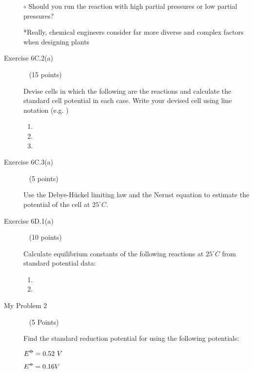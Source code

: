\documentclass[12pt, openany, letterpaper]{memoir}
\begin{document}
\begin{description}
	\vspace{7em}
	\noindent $\circ$ Should you run the reaction with high partial pressures or low partial pressures?

	\vspace{7em}
	*Really, chemical engineers consider far more diverse and complex factors when designing plants
	
	\vspace{2em}
	\item [Exercise 6C.2(a)] ~ (15 points)
	
	Devise cells in which the following are the reactions and calculate the standard cell potential in each case. Write your devised cell using line notation (e.g. )
	\begin{enumerate}
		\item {}
		
		\vspace{6em}
		\item {}
		
		\vspace{6em}
		\item {}
	\end{enumerate}
	
	\vspace{6em}
	
	\item [Exercise 6C.3(a)] ~ (5 points)
	
	Use the Debye-H\"uckel limiting law and the Nernst equation to estimate the potential of the cell  at $25^\circ C$.
	
	\vspace{25em}
	\item [Exercise 6D.1(a)] ~ (10 points)
	
	Calculate equilibrium constants of the following reactions at $25^\circ C$ from standard potential data:
	\begin{enumerate}
		\item {}
		
		\vspace{13em}
		\item {}
	\end{enumerate}

	\vspace{13em}
	\item [My Problem 2] ~ (5 Points)
	
	Find the standard reduction potential for  using the following potentials:
	
	 \hspace{2em}$E^{\std} = 0.52~V$
	
	 \hspace{2em}$E^{\std} = 0.16V$
	
	
\end{description}
\end{document}
